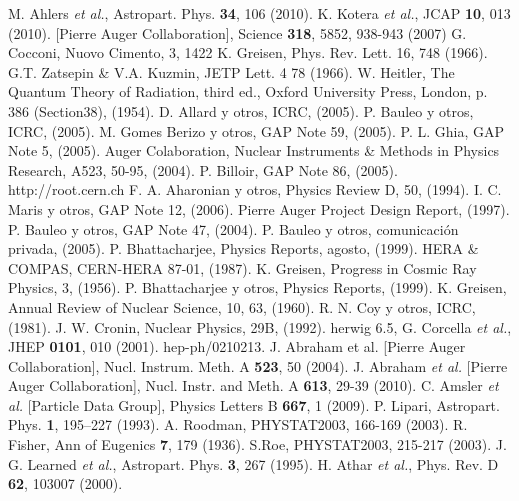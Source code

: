 \begin{thebibliography}{1}
 M. Ahlers {\it et al.}, Astropart. Phys. \textbf{34}, 106 (2010).
 K. Kotera {\it et al.}, JCAP \textbf{10}, 013 (2010).
 [Pierre Auger Collaboration], Science \textbf{318}, 5852, 938-943 (2007)
 G. Cocconi, Nuovo Cimento, 3, 1422
 K. Greisen, Phys. Rev. Lett. 16, 748 (1966).
 G.T. Zatsepin \& V.A. Kuzmin, JETP Lett. 4 78 (1966).
 W. Heitler, The Quantum Theory of Radiation, third ed., Oxford University Press, London, p. 386 (Section38), (1954).
 D. Allard y otros, ICRC, (2005).
 P. Bauleo y otros, ICRC, (2005).
 M. Gomes Berizo y otros, GAP Note 59, (2005).
 P. L. Ghia, GAP Note 5, (2005).
 Auger Colaboration, Nuclear Instruments \& Methods in Physics Research, A523, 50-95, (2004).
 P. Billoir, GAP Note 86, (2005).
 http://root.cern.ch
 F. A. Aharonian y otros, Physics Review D, 50, (1994).
 I. C. Maris y otros, GAP Note 12, (2006).
 Pierre Auger Project Design Report, (1997).
 P. Bauleo y otros, GAP Note 47, (2004).
 P. Bauleo y otros, comunicaci\'on privada, (2005).
 P. Bhattacharjee, Physics Reports, agosto, (1999).
 HERA \& COMPAS, CERN-HERA 87-01, (1987).
 K. Greisen, Progress in Cosmic Ray Physics, 3, (1956).
 P. Bhattacharjee y otros, Physics Reports, (1999).
 K. Greisen, Annual Review of Nuclear Science, 10, 63, (1960).
 R. N. Coy y otros, ICRC, (1981).
 J. W. Cronin, Nuclear Physics, 29B, (1992).
 {\sc herwig 6.5}, G. Corcella {\it et al.}, JHEP \textbf{0101}, 010 (2001). hep-ph/0210213.
 J. Abraham et al. [Pierre Auger Collaboration], Nucl. Instrum. Meth. A \textbf{523}, 50 (2004).
 J. Abraham {\it et al.} [Pierre Auger Collaboration], Nucl. Instr. and Meth. A {\bf 613}, 29-39 (2010).
 C. Amsler {\it et al.} [Particle Data Group], Physics Letters B {\bf 667}, 1 (2009).
 P. Lipari, Astropart. Phys. \textbf{1}, 195–227 (1993).
 A. Roodman, PHYSTAT2003, 166-169 (2003).
 R. Fisher, Ann of Eugenics {\bf7}, 179 (1936).
 S.Roe, PHYSTAT2003, 215-217 (2003).
 J. G. Learned {\it et al.}, Astropart. Phys. \textbf{3}, 267 (1995). H. Athar {\it et al.}, Phys. Rev. D \textbf{62}, 103007 (2000).

\end{thebibliography}
